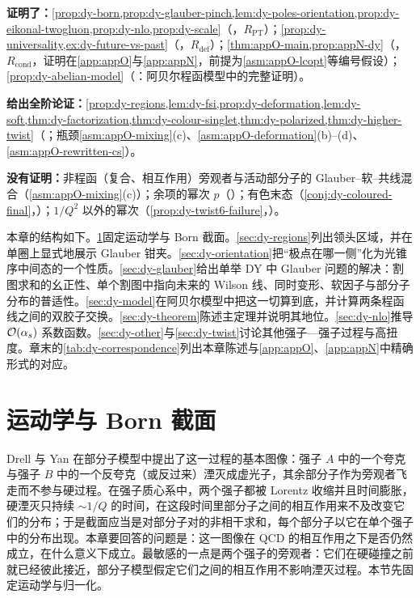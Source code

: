 \begin{tcolorbox}[enhanced,breakable,title=本章证明了什么／没有证明什么,fonttitle=\bfseries,
  colback=gray!3!white,colframe=gray!55!black,boxrule=0.6pt,arc=2pt,
  left=5pt,right=5pt,top=3pt,bottom=3pt,before skip=6pt,after skip=6pt]
\textbf{证明了：}\cref{prop:dy-born,prop:dy-glauber-pinch,lem:dy-poles-orientation,prop:dy-eikonal-twogluon,prop:dy-nlo,prop:dy-scale}（\tagR，$R_{\mathrm{PT}}$）；\cref{prop:dy-universality,ex:dy-future-vs-past}（\tagR，$R_{\mathrm{def}}$）；\cref{thm:appO-main,prop:appN-dy}（\tagR，$R_{\mathrm{cond}}$，证明在\cref{app:appO}与\cref{app:appN}，前提为\cref{asm:appO-lcopt}等编号假设）；\cref{prop:dy-abelian-model}（\tagP：阿贝尔程函模型中的完整证明）。\par
\textbf{给出全阶论证：}\cref{prop:dy-regions,lem:dy-fsi,prop:dy-deformation,lem:dy-soft,thm:dy-factorization,thm:dy-colour-singlet,thm:dy-polarized,thm:dy-higher-twist}（\tagA；瓶颈\cref{asm:appO-mixing}(c)、\cref{asm:appO-deformation}(b)--(d)、\cref{asm:appO-rewritten-cs}）。\par
\textbf{没有证明：}非程函（复合、相互作用）旁观者与活动部分子的 Glauber--软--共线混合（\cref{asm:appO-mixing}(c)）；余项的幂次 $p$（\tagC）；有色末态（\cref{conj:dy-coloured-final}，\tagC）；$1/Q^2$ 以外的幂次（\cref{prop:dy-twist6-failure}，\tagV）。
\end{tcolorbox}

本章的结构如下。\cref{sec:dy-born}固定运动学与 Born 截面。\cref{sec:dy-regions}列出领头区域，并在单圈上显式地展示 Glauber 钳夹。\cref{sec:dy-orientation}把“极点在哪一侧”化为光锥序中间态的一个性质。\cref{sec:dy-glauber}给出单举 DY 中 Glauber 问题的解决：割图求和的幺正性、单个割图中指向未来的 Wilson 线、同时变形、软因子与部分子分布的普适性。\cref{sec:dy-model}在阿贝尔模型中把这一切算到底，并计算两条程函线之间的双胶子交换。\cref{sec:dy-theorem}陈述主定理并说明其地位。\cref{sec:dy-nlo}推导 $\mathcal{O}\!\left(\alpha_s\right)$ 系数函数。\cref{sec:dy-other}与\cref{sec:dy-twist}讨论其他强子—强子过程与高扭度。章末的\cref{tab:dy-correspondence}列出本章陈述与\cref{app:appO}、\cref{app:appN}中精确形式的对应。

\section{运动学与 Born 截面}\label{sec:dy-born}

Drell 与 Yan 在部分子模型中提出了这一过程的基本图像\cite{DrellYan1970}：强子 $A$ 中的一个夸克与强子 $B$ 中的一个反夸克（或反过来）湮灭成虚光子，其余部分子作为旁观者飞走而不参与硬过程。在强子质心系中，两个强子都被 Lorentz 收缩并且时间膨胀，硬湮灭只持续 $\sim1/Q$ 的时间，在这段时间里部分子之间的相互作用来不及改变它们的分布；于是截面应当是对部分子对的非相干求和，每个部分子以它在单个强子中的分布出现。本章要回答的问题是：这一图像在 QCD 的相互作用之下是否仍然成立，在什么意义下成立。最敏感的一点是两个强子的旁观者：它们在硬碰撞之前就已经彼此接近，部分子模型假定它们之间的相互作用不影响湮灭过程。本节先固定运动学与归一化。

